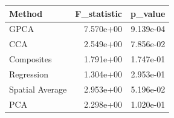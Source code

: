 \begin{tabular}{lrr}
\toprule
Method & F_statistic & p_value \\
\midrule
GPCA & 7.570e+00 & 9.139e-04 \\
CCA & 2.549e+00 & 7.856e-02 \\
Composites & 1.791e+00 & 1.747e-01 \\
Regression & 1.304e+00 & 2.953e-01 \\
Spatial Average & 2.953e+00 & 5.196e-02 \\
PCA & 2.298e+00 & 1.020e-01 \\
\bottomrule
\end{tabular}
